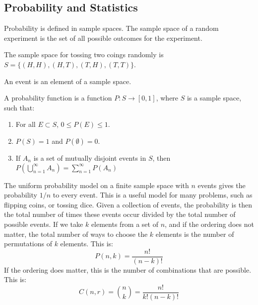 \documentclass[crop=false,class=article,oneside]{standalone}
\begin{document}
    \subsection{Probability and Statistics}
        Probability is defined in sample spaces. The sample space of
        a random experiment is the set of all
        possible outcomes for the experiment.
        \begin{example}
            The sample space for tossing two coings randomly is
            $S=\{(H,H),(H,T),(T,H),(T,T)\}$.
        \end{example}
        \begin{definition}
            An event is an element of a sample space.
        \end{definition}
        \begin{definition}
            A probability function is a function
            $P:S\rightarrow[0,1]$, where $S$ is a sample
            space, such that:
            \begin{enumerate}
                \item For all $E\subset{S}$, $0\leq{P(E)}\leq{1}$.
                \item $P(S)=1$ and $P(\emptyset)=0$.
                \item If $A_{n}$ is a set of mutually disjoint
                      events in $S$, then
                      $P(\bigcup_{n=1}^{\infty}A_{n})%
                       =\sum_{n=1}^{\infty}P(A_{n})$
            \end{enumerate}
        \end{definition}
        The uniform probability model on a finite sample space with
        $n$ events gives the probability $1/n$ to every event.
        This is a useful model for many problems, such as flipping
        coins, or tossing dice. Given a collection of events, the probability
        is then the total number of times these events occur divided by
        the total number of possible events. If we take $k$ elements from
        a set of $n$, and if the ordering does not matter, the total number of
        ways to choose the $k$ elements is the number of permutations of $k$
        elements. This is:
        \begin{equation*}
            P(n,k)=\frac{n!}{(n-k)!}
        \end{equation*}
        If the ordering does matter, this is the number of combinations
        that are possible. This is:
        \begin{equation*}
            C(n,r)=\binom{n}{k}=\frac{n!}{k!(n-k)!}
        \end{equation*}
\end{document}
